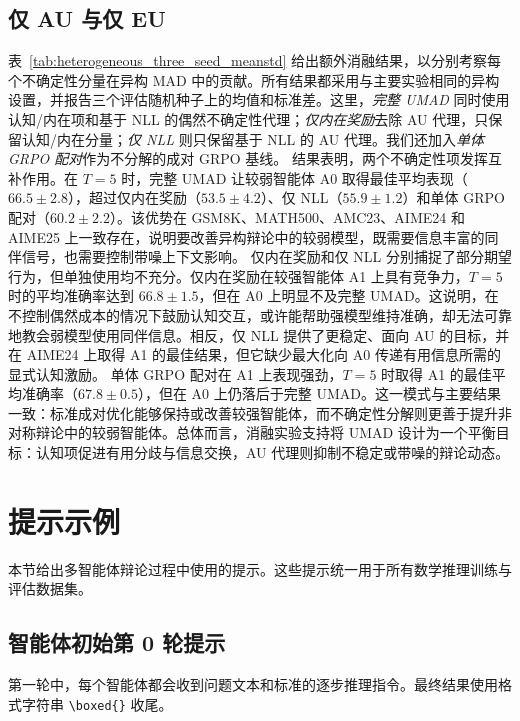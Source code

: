 \documentclass{article}
\theoremstyle{plain}
\theoremstyle{definition}
\theoremstyle{remark}
\begin{document}
\subsection{仅 AU 与仅 EU}\label{app:supply_au_eu}
表~\ref{tab:heterogeneous_three_seed_meanstd} 给出额外消融结果，以分别考察每个不确定性分量在异构 MAD 中的贡献。所有结果都采用与主要实验相同的异构设置，并报告三个评估随机种子上的均值和标准差。这里，\textit{完整 UMAD} 同时使用认知/内在项和基于 NLL 的偶然不确定性代理；\textit{仅内在奖励}去除 AU 代理，只保留认知/内在分量；\textit{仅 NLL} 则只保留基于 NLL 的 AU 代理。我们还加入\textit{单体 GRPO 配对}作为不分解的成对 GRPO 基线。
结果表明，两个不确定性项发挥互补作用。在 $T=5$ 时，完整 UMAD 让较弱智能体 A0 取得最佳平均表现（$66.5{\pm}2.8$），超过仅内在奖励（$53.5{\pm}4.2$）、仅 NLL（$55.9{\pm}1.2$）和单体 GRPO 配对（$60.2{\pm}2.2$）。该优势在 GSM8K、MATH500、AMC23、AIME24 和 AIME25 上一致存在，说明要改善异构辩论中的较弱模型，既需要信息丰富的同伴信号，也需要控制带噪上下文影响。
仅内在奖励和仅 NLL 分别捕捉了部分期望行为，但单独使用均不充分。仅内在奖励在较强智能体 A1 上具有竞争力，$T=5$ 时的平均准确率达到 $66.8{\pm}1.5$，但在 A0 上明显不及完整 UMAD。这说明，在不控制偶然成本的情况下鼓励认知交互，或许能帮助强模型维持准确，却无法可靠地教会弱模型使用同伴信息。相反，仅 NLL 提供了更稳定、面向 AU 的目标，并在 AIME24 上取得 A1 的最佳结果，但它缺少最大化向 A0 传递有用信息所需的显式认知激励。
单体 GRPO 配对在 A1 上表现强劲，$T=5$ 时取得 A1 的最佳平均准确率（$67.8{\pm}0.5$），但在 A0 上仍落后于完整 UMAD。这一模式与主要结果一致：标准成对优化能够保持或改善较强智能体，而不确定性分解则更善于提升非对称辩论中的较弱智能体。总体而言，消融实验支持将 UMAD 设计为一个平衡目标：认知项促进有用分歧与信息交换，AU 代理则抑制不稳定或带噪的辩论动态。











\section{提示示例}\label{app:prompts}

本节给出多智能体辩论过程中使用的提示。这些提示统一用于所有数学推理训练与评估数据集。

\subsection{智能体初始第 0 轮提示}

第一轮中，每个智能体都会收到问题文本和标准的逐步推理指令。最终结果使用格式字符串 \texttt{\textbackslash boxed\{\}} 收尾。
\end{document}
